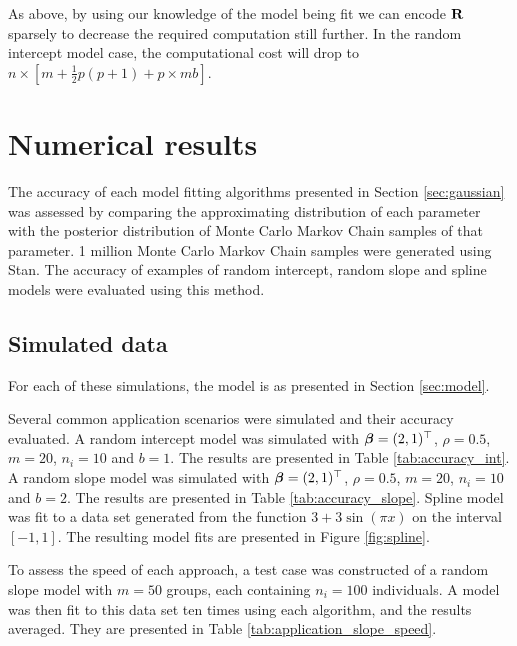 	As above, by using our knowledge of the model being fit we can encode ${\bf R}$ sparsely to decrease
	the required   computation still further. In the random intercept model case, the computational cost will drop
	to   $n \times [m + \frac{1}{2} p (p + 1) + p \times m b]$.
				
			\section{Numerical results}
			\label{sec:results}
					
			The accuracy of each model fitting algorithms presented in Section \ref{sec:gaussian} was assessed by
			comparing the approximating distribution of each parameter with the posterior distribution of Monte Carlo
			Markov Chain samples of that parameter. 1 million Monte Carlo Markov Chain samples were generated using Stan.
			The accuracy of examples of random intercept, random slope and spline models were evaluated using this method.
					
			\subsection{Simulated data}
					
			For each of these simulations, the model is as presented in Section \ref{sec:model}.
					
			Several common application scenarios were simulated and their accuracy evaluated. A random intercept model was simulated with ${\boldsymbol \beta} = (2, 1)^\top$, $\rho = 0.5$, $m = 20$, $n_i = 10$ and $b = 1$. The results are
			presented in Table \ref{tab:accuracy_int}. A random slope model was simulated with ${\boldsymbol \beta} = (2, 1)^\top$,
			$\rho = 0.5$, $m = 20$, $n_i = 10$ and $b = 2$. The results are presented in Table \ref{tab:accuracy_slope}.
			Spline model was fit to a data set generated from the function $3 + 3 \sin{(\pi x)}$ on the interval $[-1,
			1]$. The resulting model fits are presented in Figure \ref{fig:spline}.
					
			To assess the speed of each approach, a test case was constructed of a random slope model with $m=50$ groups,	each containing $n_i = 100$ individuals. A model was then fit to this data set ten times using each algorithm, and the results averaged. They are presented in Table \ref{tab:application_slope_speed}.

